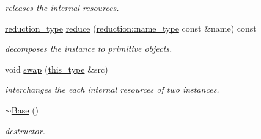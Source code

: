 \begin{DoxyCompactItemize}
\begin{DoxyCompactList}\small\item\em releases the internal resources. \end{DoxyCompactList}\item 
\hypertarget{classhryky_1_1http_1_1header_1_1field_1_1dispatcher_1_1_base_a2809ad5f75abd2266e6804e90094bc05}{\hyperlink{namespacehryky_a343a9a4c36a586be5c2693156200eadc}{reduction\-\_\-type} \hyperlink{classhryky_1_1http_1_1header_1_1field_1_1dispatcher_1_1_base_a2809ad5f75abd2266e6804e90094bc05}{reduce} (\hyperlink{namespacehryky_1_1reduction_ac686c30a4c8d196bbd0f05629a6b921f}{reduction\-::name\-\_\-type} const \&name) const }\label{classhryky_1_1http_1_1header_1_1field_1_1dispatcher_1_1_base_a2809ad5f75abd2266e6804e90094bc05}

\begin{DoxyCompactList}\small\item\em decomposes the instance to primitive objects. \end{DoxyCompactList}\item 
\hypertarget{classhryky_1_1http_1_1header_1_1field_1_1dispatcher_1_1_base_ab2b137d16fbe40d839ee136bd5304cab}{void \hyperlink{classhryky_1_1http_1_1header_1_1field_1_1dispatcher_1_1_base_ab2b137d16fbe40d839ee136bd5304cab}{swap} (\hyperlink{classhryky_1_1http_1_1header_1_1field_1_1dispatcher_1_1_base_ad3afdc056a3d7e53ca6eb6074d84583b}{this\-\_\-type} \&src)}\label{classhryky_1_1http_1_1header_1_1field_1_1dispatcher_1_1_base_ab2b137d16fbe40d839ee136bd5304cab}

\begin{DoxyCompactList}\small\item\em interchanges the each internal resources of two instances. \end{DoxyCompactList}\item 
\hypertarget{classhryky_1_1http_1_1header_1_1field_1_1dispatcher_1_1_base_a722da881b6c70cfcbde9243abcfbf334}{\hyperlink{classhryky_1_1http_1_1header_1_1field_1_1dispatcher_1_1_base_a722da881b6c70cfcbde9243abcfbf334}{$\sim$\-Base} ()}\label{classhryky_1_1http_1_1header_1_1field_1_1dispatcher_1_1_base_a722da881b6c70cfcbde9243abcfbf334}

\begin{DoxyCompactList}\small\item\em destructor. \end{DoxyCompactList}\end{DoxyCompactItemize}
